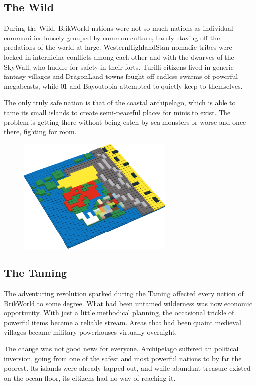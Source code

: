 \documentclass[12pt,a4paper,twocolumn]{article}
\begin{document}
\subsection {The Wild}

During the Wild, BrikWorld nations were not so much nations as individual communities loosely grouped by common culture, barely staving off the predations of the world at large.  WesternHighlandStan nomadic tribes were locked in internicine conflicts among each other and with the dwarves of the SkyWall, who huddle for safety in their forts.  Turilli citizens lived in generic fantasy villages and DragonLand towns fought off endless swarms of powerful megabeasts, while 01 and Bayoutopia attempted to quietly keep to themselves.

The only truly safe nation is that of the coastal archipelago, which is able to tame its small islands to create semi-peaceful places for minis to exist.  The problem is getting there without being eaten by sea monsters or worse and once there, fighting for room.


\begin{figure}[h]
\includegraphics[width=3in]{TamingNations.png}
\end{figure}

\subsection{The Taming}

The adventuring revolution sparked during the Taming affected every nation of BrikWorld to some degree.  What had been untamed wilderness was now economic opportunity.  With just a little methodical planning, the occasional trickle of powerful items became a reliable stream.  Areas that had been quaint medieval villages became military powerhouses virtually overnight.

The change was not good news for everyone.  Archipelago suffered an political inversion, going from one of the safest and most powerful nations to by far the poorest.  Its islands were already tapped out, and while abundant treasure existed on the ocean floor, its citizens had no way of reaching it.
\end{document}
